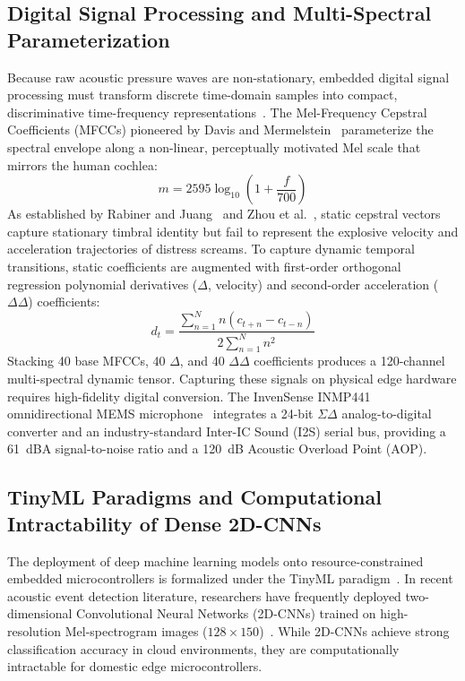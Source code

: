 \documentclass[12pt, a4paper]{report}
\begin{document}
\subsection{Digital Signal Processing and Multi-Spectral Parameterization}
Because raw acoustic pressure waves are non-stationary, embedded digital signal processing must transform discrete time-domain samples into compact, discriminative time-frequency representations~\cite{ref_oppenheim2010}. The Mel-Frequency Cepstral Coefficients (MFCCs) pioneered by Davis and Mermelstein~\cite{ref_davis1980} parameterize the spectral envelope along a non-linear, perceptually motivated Mel scale that mirrors the human cochlea:
\begin{equation}
m = 2595 \log_{10}\left(1 + \frac{f}{700}\right)
\end{equation}
As established by Rabiner and Juang~\cite{ref_rabiner1993} and Zhou et al.~\cite{ref_zhou2011}, static cepstral vectors capture stationary timbral identity but fail to represent the explosive velocity and acceleration trajectories of distress screams. To capture dynamic temporal transitions, static coefficients are augmented with first-order orthogonal regression polynomial derivatives ($\Delta$, velocity) and second-order acceleration ($\Delta\Delta$) coefficients:
\begin{equation}
d_t = \frac{\sum_{n=1}^{N} n (c_{t+n} - c_{t-n})}{2 \sum_{n=1}^{N} n^2}
\end{equation}
Stacking 40 base MFCCs, 40 $\Delta$, and 40 $\Delta\Delta$ coefficients produces a 120-channel multi-spectral dynamic tensor. Capturing these signals on physical edge hardware requires high-fidelity digital conversion. The InvenSense INMP441 omnidirectional MEMS microphone~\cite{ref_invensense2014} integrates a 24-bit $\Sigma\Delta$ analog-to-digital converter and an industry-standard Inter-IC Sound (I2S) serial bus, providing a 61~dBA signal-to-noise ratio and a 120~dB Acoustic Overload Point (AOP).

\subsection{TinyML Paradigms and Computational Intractability of Dense 2D-CNNs}
The deployment of deep machine learning models onto resource-constrained embedded microcontrollers is formalized under the TinyML paradigm~\cite{ref_almaini2025}. In recent acoustic event detection literature, researchers have frequently deployed two-dimensional Convolutional Neural Networks (2D-CNNs) trained on high-resolution Mel-spectrogram images ($128 \times 150$)~\cite{ref_hershey2017}. While 2D-CNNs achieve strong classification accuracy in cloud environments, they are computationally intractable for domestic edge microcontrollers.
\end{document}
